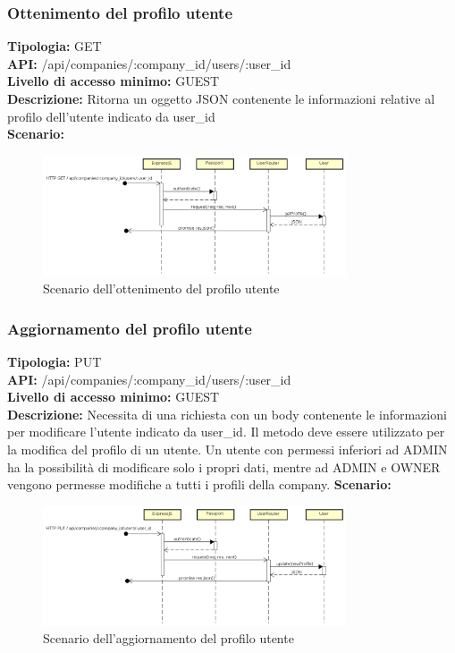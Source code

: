\newpage
\subsubsection{Ottenimento del profilo utente}
\textbf{Tipologia:} GET \\
\textbf{API:} /api/companies/:company\_id/users/:user\_id \\
\textbf{Livello di accesso minimo:} GUEST \\
\textbf{Descrizione:} Ritorna un oggetto JSON contenente le informazioni relative al profilo dell'utente indicato da user\_id \\
\textbf{Scenario:} 
\begin{figure}[h]
\centering
\includegraphics[width=0.8\textwidth]{res/sections/backend/(GET)profiloUtente.png}
\caption{Scenario dell'ottenimento del profilo utente}
\end{figure}

\newpage
\subsubsection{Aggiornamento del profilo utente}
\textbf{Tipologia:} PUT \\
\textbf{API:} /api/companies/:company\_id/users/:user\_id \\
\textbf{Livello di accesso minimo:} GUEST \\
\textbf{Descrizione:} Necessita di una richiesta con un body contenente le informazioni per modificare l'utente indicato da user\_id. Il metodo deve essere utilizzato per la modifica del profilo di un utente. Un utente con permessi inferiori ad ADMIN ha la possibilità di modificare solo i propri dati, mentre ad ADMIN e OWNER vengono permesse modifiche a tutti i profili della company. 
\textbf{Scenario:} 
\begin{figure}[h]
\centering
\includegraphics[width=0.8\textwidth]{res/sections/backend/(PUT)profiloUtente.png}
\caption{Scenario dell'aggiornamento del profilo utente}
\end{figure}

